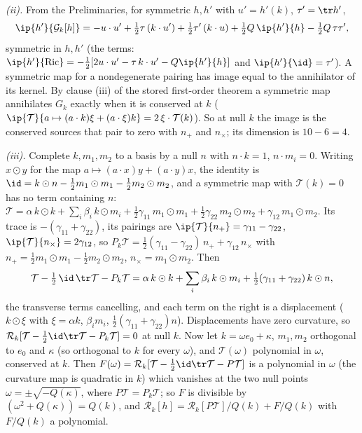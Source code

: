 \emph{(ii).} From the Preliminaries, for symmetric $h, h'$ with $u' = h'(k)$, $\tau' = \tr h'$,
\[
\ip{h'}{\mathcal{G}_{k}[h]} = -u \cdot u' + \tfrac12\tau\,(k \cdot u') + \tfrac12\tau'\,(k \cdot u) + \tfrac12 Q\,\ip{h'}{h} - \tfrac12 Q\,\tau\tau' ,
\]
symmetric in $h, h'$ (the terms: $\ip{h'}{\mathrm{Ric}} = -\tfrac12[2u \cdot u' - \tau\,k \cdot u' - Q\ip{h'}{h}]$ and $\ip{h'}{\id} = \tau'$). A symmetric map for a nondegenerate pairing has image equal to the annihilator of its kernel. By clause (iii) of the stored first-order theorem a symmetric map annihilates $G_{k}$ exactly when it is conserved at $k$ ($\ip{\mathcal{T}}{a \mapsto (a \cdot k)\xi + (a \cdot \xi)k} = 2\,\xi \cdot \mathcal{T}(k)$). So at null $k$ the image is the conserved sources that pair to zero with $n_{+}$ and $n_{\times}$; its dimension is $10 - 6 = 4$.

\emph{(iii).} Complete $k, m_{1}, m_{2}$ to a basis by a null $n$ with $n \cdot k = 1$, $n \cdot m_{i} = 0$. Writing $x \odot y$ for the map $a \mapsto (a \cdot x)y + (a \cdot y)x$, the identity is $\id = k \odot n - \tfrac12 m_{1} \odot m_{1} - \tfrac12 m_{2} \odot m_{2}$, and a symmetric map with $\mathcal{T}(k) = 0$ has no term containing $n$: $\mathcal{T} = \alpha\,k \odot k + \sum_{i}\beta_{i}\,k \odot m_{i} + \tfrac12\gamma_{11}\,m_{1} \odot m_{1} + \tfrac12\gamma_{22}\,m_{2} \odot m_{2} + \gamma_{12}\,m_{1} \odot m_{2}$. Its trace is $-(\gamma_{11} + \gamma_{22})$, its pairings are $\ip{\mathcal{T}}{n_{+}} = \gamma_{11} - \gamma_{22}$, $\ip{\mathcal{T}}{n_{\times}} = 2\gamma_{12}$, so $P_{k}\mathcal{T} = \tfrac12(\gamma_{11} - \gamma_{22})\,n_{+} + \gamma_{12}\,n_{\times}$ with $n_{+} = \tfrac12 m_{1} \odot m_{1} - \tfrac12 m_{2} \odot m_{2}$, $n_{\times} = m_{1} \odot m_{2}$. Then
\[
\mathcal{T} - \tfrac12\,\id\,\tr\mathcal{T} - P_{k}\mathcal{T} = \alpha\,k \odot k + \sum_{i}\beta_{i}\,k \odot m_{i} + \tfrac12(\gamma_{11} + \gamma_{22})\,k \odot n ,
\]
the transverse terms cancelling, and each term on the right is a displacement ($k \odot \xi$ with $\xi = \alpha k$, $\beta_{i}m_{i}$, $\tfrac12(\gamma_{11} + \gamma_{22})n$). Displacements have zero curvature, so $\mathcal{R}_{k}[\mathcal{T} - \tfrac12\id\tr\mathcal{T} - P_{k}\mathcal{T}] = 0$ at null $k$. Now let $k = \omega e_{0} + \kappa$, $m_{1}, m_{2}$ orthogonal to $e_{0}$ and $\kappa$ (so orthogonal to $k$ for every $\omega$), and $\mathcal{T}(\omega)$ polynomial in $\omega$, conserved at $k$. Then $F(\omega) = \mathcal{R}_{k}[\mathcal{T} - \tfrac12\id\tr\mathcal{T} - P\mathcal{T}]$ is a polynomial in $\omega$ (the curvature map is quadratic in $k$) which vanishes at the two null points $\omega = \pm\sqrt{-Q(\kappa)}$, where $P\mathcal{T} = P_{k}\mathcal{T}$; so $F$ is divisible by $(\omega^{2} + Q(\kappa)) = Q(k)$, and $\mathcal{R}_{k}[h] = \mathcal{R}_{k}[P\mathcal{T}]/Q(k) + F/Q(k)$ with $F/Q(k)$ a polynomial.

